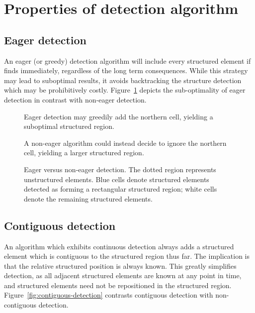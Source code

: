 \section{Properties of detection algorithm}

\subsection{Eager detection}
An eager (or greedy) detection algorithm will include every structured element if finds immediately, regardless of the long term consequences. While this strategy may lead to suboptimal results, it avoids backtracking the structure detection which may be prohibitively costly. Figure~\ref{fig:eager-detection} depicts the sub-optimality of eager detection in contrast with non-eager detection.


\begin{figure}

\sidebyside
{
	\drawmatrix[cell wd=0.6, cell ht=0.6]{\eagermatrix}
	\caption{Eager detection may greedily add the northern cell, yielding a suboptimal structured region.}
}
{
	\drawmatrix[cell wd=0.6, cell ht=0.6]{\noneagermatrix}
	\caption{A non-eager algorithm could instead decide to ignore the northern cell, yielding a larger structured region.}
}
\caption{Eager versus non-eager detection. The dotted region represents unstructured elements. Blue cells denote structured elements detected as forming a rectangular structured region; white cells denote the remaining structured elements.\label{fig:eager-detection}}
\end{figure}



\subsection{Contiguous detection}
\label{subsec:contiguous-detection}
An algorithm which exhibits continuous detection always adds a structured element which is contiguous to the structured region thus far. The implication is that the relative structured position is always known. This greatly simplifies detection, as all adjacent structured elements are known at any point in time, and structured elements need not be repositioned in the structured region. Figure~\ref{fig:contiguous-detection} contrasts contiguous detection with non-contiguous detection.

